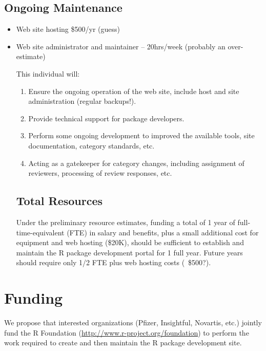 \documentclass[12pt]{article}
\begin{document}
\subsection{Ongoing Maintenance}

\begin{itemize}

\item Web site hosting \$500/yr  (guess)

\item Web site administrator and maintainer -- 20hrs/week (probably an
  over-estimate)

  This individual will:

  \begin{enumerate}

  \item Ensure the ongoing operation of the web site, include host and
    site administration (regular backups!).

  \item Provide technical support for package developers.

  \item Perform some ongoing development to improved the available
    tools, site documentation, category standards, etc.

  \item Acting as a gatekeeper for category changes, including
    assignment of reviewers, processing of review responses, etc.

  \end{enumerate}


\subsection{Total Resources}

Under the preliminary resource estimates, funding a total of 1
year of full-time-equivalent (FTE) in salary and benefits, plus a
small additional cost for equipment and web hosting (\$20K), should
be sufficient to establish and maintain the R package development
portal for 1 full year.  Future years should require only 1/2 FTE
plus web hosting costs (~\$500?).

\end{itemize}

\section{Funding}


We propose that interested organizations (Pfizer, Insightful,
Novartis, etc.) jointly fund the R Foundation
(\url{http://www.r-project.org/foundation}) to perform the work
required to create and then maintain the R package development
site.
\end{document}
